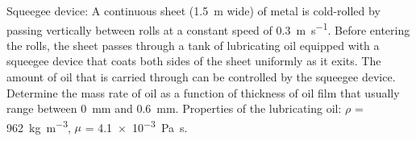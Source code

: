 \begin{question} 
Squeegee device: A continuous sheet (\SI{1.5}{\metre} wide) of metal is cold-rolled by passing vertically between rolls at a constant speed of \SI{0.3}{\metre\per\second}. Before entering the rolls, the sheet passes through a tank of lubricating oil equipped with a squeegee device that coats both sides of the sheet uniformly as it exits. The amount of oil that is carried through can be controlled by the squeegee device. Determine the mass rate of oil as a function of thickness of oil film that usually range between \SI{0}{\milli\metre} and \SI{0.6}{\milli\metre}. Properties of the lubricating oil: $\rho$ = \SI{962}{\kilo\gram\per\metre\cubed}, $\mu$ = \SI{4.1e-3}{\pascal\second}.
\end{question}
\begin{solution}[print]
\end{solution}


